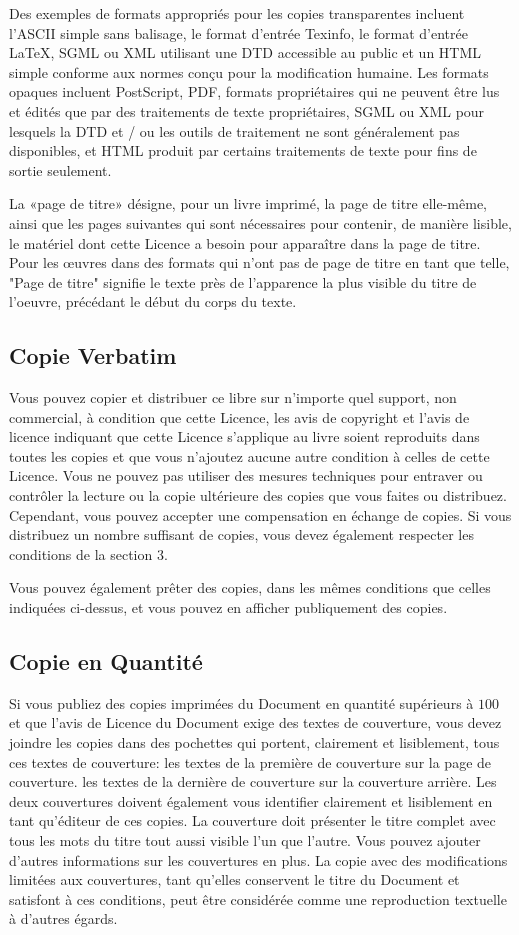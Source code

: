 	Des exemples de formats appropriés pour les copies transparentes incluent l'ASCII simple sans balisage, le format d'entrée Texinfo, le format d'entrée LaTeX, SGML ou XML utilisant une DTD accessible au public et un HTML simple conforme aux normes conçu pour la modification humaine. Les formats opaques incluent PostScript, PDF, formats propriétaires qui ne peuvent être lus et édités que par des traitements de texte propriétaires, SGML ou XML pour lesquels la DTD et / ou les outils de traitement ne sont généralement pas disponibles, et HTML produit par certains traitements de texte pour fins de sortie seulement.

	La «page de titre» désigne, pour un livre imprimé, la page de titre elle-même, ainsi que les pages suivantes qui sont nécessaires pour contenir, de manière lisible, le matériel dont cette Licence a besoin pour apparaître dans la page de titre. Pour les œuvres dans des formats qui n'ont pas de page de titre en tant que telle, "Page de titre" signifie le texte près de l'apparence la plus visible du titre de l'oeuvre, précédant le début du corps du texte.

	\subsection{Copie Verbatim} 
	Vous pouvez copier et distribuer ce libre sur n'importe quel support, non commercial, à condition que cette Licence, les avis de copyright et l'avis de licence indiquant que cette Licence s'applique au livre soient reproduits dans toutes les copies et que vous n'ajoutez aucune autre condition à celles de cette Licence. Vous ne pouvez pas utiliser des mesures techniques pour entraver ou contrôler la lecture ou la copie ultérieure des copies que vous faites ou distribuez. Cependant, vous pouvez accepter une compensation en échange de copies. Si vous distribuez un nombre suffisant de copies, vous devez également respecter les conditions de la section 3.

	Vous pouvez également prêter des copies, dans les mêmes conditions que celles indiquées ci-dessus, et vous pouvez en afficher publiquement des copies. 

	\subsection{Copie en Quantité}
	Si vous publiez des copies imprimées du Document en quantité supérieurs à $100$ et que l'avis de Licence du Document exige des textes de couverture, vous devez joindre les copies dans des pochettes qui portent, clairement et lisiblement, tous ces textes de couverture: les textes de la première de couverture sur la page de couverture. les textes de la dernière de couverture sur la couverture arrière. Les deux couvertures doivent également vous identifier clairement et lisiblement en tant qu'éditeur de ces copies. La couverture doit présenter le titre complet avec tous les mots du titre tout aussi visible l'un que l'autre. Vous pouvez ajouter d'autres informations sur les couvertures en plus. La copie avec des modifications limitées aux couvertures, tant qu'elles conservent le titre du Document et satisfont à ces conditions, peut être considérée comme une reproduction textuelle à d'autres égards.

